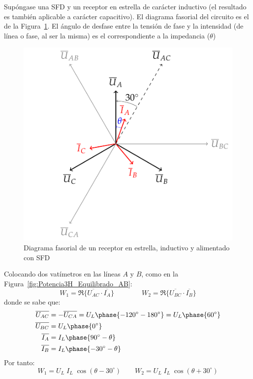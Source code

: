 	Supóngase una SFD y un receptor en estrella de carácter inductivo (el resultado es también aplicable a carácter capacitivo). El diagrama fasorial del circuito es el de la Figura~\ref{fig:fasores_potencia3H}. El ángulo de desfase entre la tensión de fase y la intensidad (de línea o fase, al ser la misma) es el correspondiente a la impedancia ($\theta$)
	\begin{figure}[H]
	    \centering
	    \includegraphics{../figs/fasores_potencia3H.pdf}
	    \caption{Diagrama fasorial de un receptor en estrella, inductivo y alimentado con SFD}
	    \label{fig:fasores_potencia3H}
	\end{figure}
	
	Colocando dos vatímetros en las líneas $A$ y $B$, como en la Figura~\ref{fig:Potencia3H_Equilibrado_AB}:
	\begin{equation*}
	    W_1=\Re\{\overline{U_{AC}} \cdot \overline{I_A}\}\qquad\qquad W_2=\Re\{\overline{U_{BC}} \cdot \overline{I_B}\}
	\end{equation*}
	donde se sabe que:
	\begin{align*} \overline{U_{AC}}&=-\overline{U_{CA}}=U_L\phase{-120^\circ-180^\circ}=U_L\phase{60^\circ}\\ \overline{U_{BC}}&=U_L\phase{0^\circ}\\ \overline{I_A}&=I_L\phase{90^\circ-\theta}\\ \overline{I_B}&=I_L\phase{-30^\circ-\theta} 
	\end{align*}
	Por tanto: 
	\begin{equation*}
	    W_1=U_L\;I_L\;\cos{(\theta-30^\circ)}\qquad W_2={U_L}\; {I_L}\;\cos{(\theta+30^\circ)}
	\end{equation*}
	
